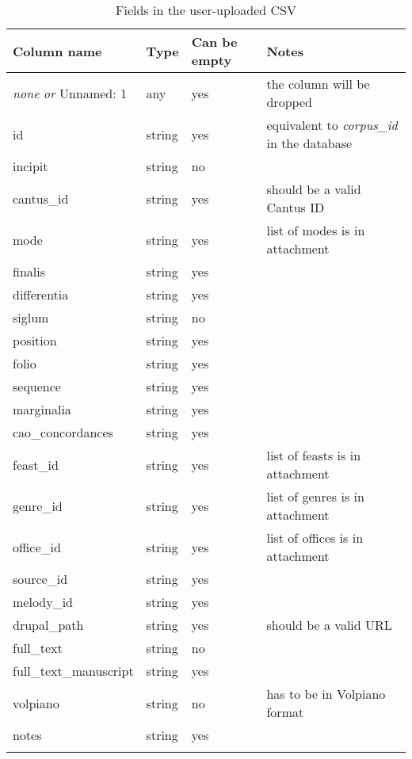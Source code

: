 \begin{longtable}{| p{} | p{} | p{} | p{} |}
 \hline
 Column name     & Type  & Can be empty  & Notes \\
 \hline
 \emph{none} \emph{or} Unnamed: 1 & any & yes & the column will be dropped  \\ \hline
 id             & string & yes & equivalent to \emph{corpus\_id} in the database \\ \hline
 incipit        & string & no  & \\ \hline
 cantus\_id     & string & yes & should be a valid Cantus ID \\ \hline
 mode           & string & yes & list of modes is in attachment \\ \hline
 finalis        & string & yes & \\ \hline
 differentia    & string & yes & \\ \hline
 siglum         & string & no  & \\ \hline
 position       & string & yes & \\ \hline
 folio          & string & yes & \\ \hline
 sequence       & string & yes & \\ \hline
 marginalia     & string & yes & \\ \hline
 cao\_concordances & string & yes & \\ \hline
 feast\_id      & string & yes & list of feasts is in attachment \\ \hline
 genre\_id      & string & yes & list of genres is in attachment \\ \hline
 office\_id     & string & yes & list of offices is in attachment \\ \hline
 source\_id     & string & yes & \\ \hline
 melody\_id     & string & yes & \\ \hline
 drupal\_path   & string & yes & should be a valid URL \\ \hline
 full\_text     & string & no  & \\ \hline
 full\_text\_manuscript & string & yes & \\ \hline
 volpiano       & string & no  & has to be in Volpiano format \\ \hline
 notes          & string & yes & \\
 \hline

\caption{Fields in the user-uploaded CSV}
\end{longtable}

